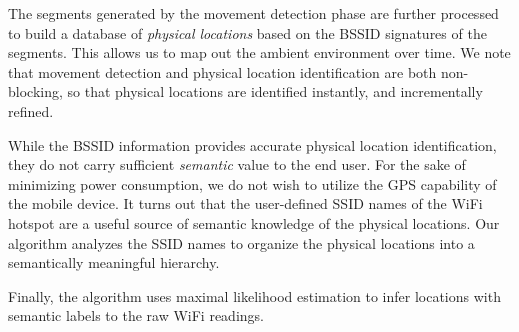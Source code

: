 
The segments generated by the movement detection phase are further processed to
build a database of {\em physical locations} based on the BSSID signatures of
the segments.  This allows us to map out the ambient environment over time.  We
note that movement detection and physical location identification are both
non-blocking, so that physical locations are identified instantly, and
incrementally refined.


While the BSSID information provides accurate physical location identification,
they do not carry sufficient {\em semantic} value to the end user.  For the sake
of minimizing power consumption, we do not wish to utilize the GPS capability of
the mobile device.  It turns out that the user-defined SSID names of the WiFi
hotspot are a useful source of semantic knowledge of the physical locations.
Our algorithm analyzes the SSID names to organize the physical locations into a
semantically meaningful hierarchy.


Finally, the algorithm uses maximal likelihood estimation to infer locations
with semantic labels to the raw WiFi readings.


